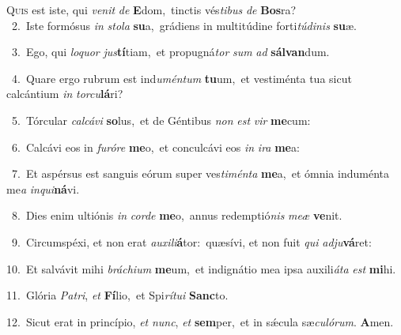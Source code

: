 \lettrine{\initial\textcolor{\initialcolor}{Q}}{uis} est iste, qui \textit{ve}\-\textit{nit} \textit{de} \textbf{E}\-dom,~\star tinctis vés\-\textit{ti}\-\textit{bus} \textit{de} \textbf{Bos}\-ra?\\
{\numbfont\textcolor{\numbcolor}{~2.}}~Iste formósus \textit{in} \textit{sto}\-\textit{la} \textbf{su}\-a,~\star grádiens in multitúdine forti\-\textit{tú}\-\textit{di}\textit{nis} \textbf{su}\-æ.\par
{\numbfont\textcolor{\numbcolor}{~3.}}~Ego, qui \textit{lo}\-\textit{quor} \textit{jus}\-\textbf{tí}tiam,~\star et propugná\textit{tor} \textit{sum} \textit{ad} \textbf{sál}\-\textbf{van}dum.\par
{\numbfont\textcolor{\numbcolor}{~4.}}~Quare ergo rubrum est ind\-\textit{u}\-\textit{mén}\textit{tum} \textbf{tu}\-um,~\star et vestiménta tua sicut calcántium \textit{in} \textit{tor}\-\textit{cu}\textbf{lá}ri?\par
{\numbfont\textcolor{\numbcolor}{~5.}}~Tórcular \textit{cal}\-\textit{cá}\textit{vi} \textbf{so}\-lus,~\star et de Géntibus \textit{non} \textit{est} \textit{vir} \textbf{me}\-cum:\par
{\numbfont\textcolor{\numbcolor}{~6.}}~Calcávi eos in \textit{fu}\-\textit{ró}\textit{re} \textbf{me}\-o,~\star et conculcávi eos \textit{in} \textit{i}\-\textit{ra} \textbf{me}\-a:\par
{\numbfont\textcolor{\numbcolor}{~7.}}~Et aspérsus est sanguis eórum super ves\-\textit{ti}\-\textit{mén}\textit{ta} \textbf{me}\-a,~\star et ómnia induménta me\textit{a} \textit{in}\-\textit{qui}\textbf{ná}vi.\par
{\numbfont\textcolor{\numbcolor}{~8.}}~Dies enim ultiónis \textit{in} \textit{cor}\-\textit{de} \textbf{me}\-o,~\star annus redemptió\textit{nis} \textit{me}\-\textit{æ} \textbf{ve}\-nit.\par
{\numbfont\textcolor{\numbcolor}{~9.}}~Circumspéxi, et non erat \textit{au}\-\textit{xi}\textit{li}\textbf{á}tor:~\star quæsívi, et non fuit \textit{qui} \textit{ad}\-\textit{ju}\textbf{vá}ret:\par
{\numbfont\textcolor{\numbcolor}{10.}}~Et salvávit mihi \textit{brá}\-\textit{chi}\textit{um} \textbf{me}\-um,~\star et indignátio mea ipsa auxili\-\textit{á}\-\textit{ta} \textit{est} \textbf{mi}\-hi.\par
{\numbfont\textcolor{\numbcolor}{11.}}~Glória \textit{Pa}\-\textit{tri}, \textit{et} \textbf{Fí}\-lio,~\star et Spi\-\textit{rí}\-\textit{tu}\textit{i} \textbf{Sanc}\-to.\par
{\numbfont\textcolor{\numbcolor}{12.}}~Sicut erat in princípio, \textit{et} \textit{nunc}\-, \textit{et} \textbf{sem}\-per,~\star et in sǽcula sæ\-\textit{cu}\-\textit{ló}\textit{rum}. \textbf{A}\-men.\par
